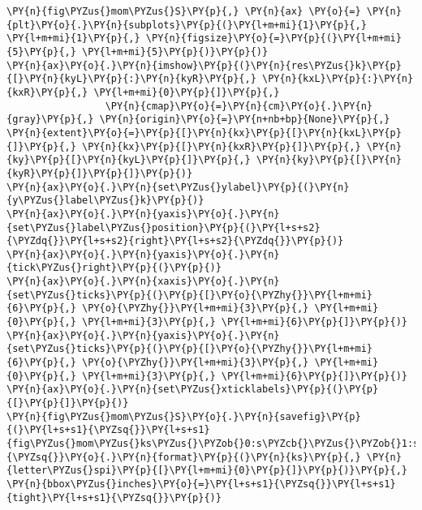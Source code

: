 \begin{Verbatim}[commandchars=\\\{\}]
\PY{n}{fig\PYZus{}mom\PYZus{}S}\PY{p}{,} \PY{n}{ax} \PY{o}{=} \PY{n}{plt}\PY{o}{.}\PY{n}{subplots}\PY{p}{(}\PY{l+m+mi}{1}\PY{p}{,} \PY{l+m+mi}{1}\PY{p}{,} \PY{n}{figsize}\PY{o}{=}\PY{p}{(}\PY{l+m+mi}{5}\PY{p}{,} \PY{l+m+mi}{5}\PY{p}{)}\PY{p}{)}
\PY{n}{ax}\PY{o}{.}\PY{n}{imshow}\PY{p}{(}\PY{n}{res\PYZus{}k}\PY{p}{[}\PY{n}{kyL}\PY{p}{:}\PY{n}{kyR}\PY{p}{,} \PY{n}{kxL}\PY{p}{:}\PY{n}{kxR}\PY{p}{,} \PY{l+m+mi}{0}\PY{p}{]}\PY{p}{,}
                 \PY{n}{cmap}\PY{o}{=}\PY{n}{cm}\PY{o}{.}\PY{n}{gray}\PY{p}{,} \PY{n}{origin}\PY{o}{=}\PY{n+nb+bp}{None}\PY{p}{,} \PY{n}{extent}\PY{o}{=}\PY{p}{[}\PY{n}{kx}\PY{p}{[}\PY{n}{kxL}\PY{p}{]}\PY{p}{,} \PY{n}{kx}\PY{p}{[}\PY{n}{kxR}\PY{p}{]}\PY{p}{,} \PY{n}{ky}\PY{p}{[}\PY{n}{kyL}\PY{p}{]}\PY{p}{,} \PY{n}{ky}\PY{p}{[}\PY{n}{kyR}\PY{p}{]}\PY{p}{]}\PY{p}{)}
\PY{n}{ax}\PY{o}{.}\PY{n}{set\PYZus{}ylabel}\PY{p}{(}\PY{n}{y\PYZus{}label\PYZus{}k}\PY{p}{)}
\PY{n}{ax}\PY{o}{.}\PY{n}{yaxis}\PY{o}{.}\PY{n}{set\PYZus{}label\PYZus{}position}\PY{p}{(}\PY{l+s+s2}{\PYZdq{}}\PY{l+s+s2}{right}\PY{l+s+s2}{\PYZdq{}}\PY{p}{)}
\PY{n}{ax}\PY{o}{.}\PY{n}{yaxis}\PY{o}{.}\PY{n}{tick\PYZus{}right}\PY{p}{(}\PY{p}{)}
\PY{n}{ax}\PY{o}{.}\PY{n}{xaxis}\PY{o}{.}\PY{n}{set\PYZus{}ticks}\PY{p}{(}\PY{p}{[}\PY{o}{\PYZhy{}}\PY{l+m+mi}{6}\PY{p}{,} \PY{o}{\PYZhy{}}\PY{l+m+mi}{3}\PY{p}{,} \PY{l+m+mi}{0}\PY{p}{,} \PY{l+m+mi}{3}\PY{p}{,} \PY{l+m+mi}{6}\PY{p}{]}\PY{p}{)}
\PY{n}{ax}\PY{o}{.}\PY{n}{yaxis}\PY{o}{.}\PY{n}{set\PYZus{}ticks}\PY{p}{(}\PY{p}{[}\PY{o}{\PYZhy{}}\PY{l+m+mi}{6}\PY{p}{,} \PY{o}{\PYZhy{}}\PY{l+m+mi}{3}\PY{p}{,} \PY{l+m+mi}{0}\PY{p}{,} \PY{l+m+mi}{3}\PY{p}{,} \PY{l+m+mi}{6}\PY{p}{]}\PY{p}{)}
\PY{n}{ax}\PY{o}{.}\PY{n}{set\PYZus{}xticklabels}\PY{p}{(}\PY{p}{[}\PY{p}{]}\PY{p}{)}
\PY{n}{fig\PYZus{}mom\PYZus{}S}\PY{o}{.}\PY{n}{savefig}\PY{p}{(}\PY{l+s+s1}{\PYZsq{}}\PY{l+s+s1}{fig\PYZus{}mom\PYZus{}ks\PYZus{}\PYZob{}0:s\PYZcb{}\PYZus{}\PYZob{}1:s\PYZcb{}}\PY{l+s+s1}{\PYZsq{}}\PY{o}{.}\PY{n}{format}\PY{p}{(}\PY{n}{ks}\PY{p}{,} \PY{n}{letter\PYZus{}spi}\PY{p}{[}\PY{l+m+mi}{0}\PY{p}{]}\PY{p}{)}\PY{p}{,} \PY{n}{bbox\PYZus{}inches}\PY{o}{=}\PY{l+s+s1}{\PYZsq{}}\PY{l+s+s1}{tight}\PY{l+s+s1}{\PYZsq{}}\PY{p}{)}


\end{Verbatim}
